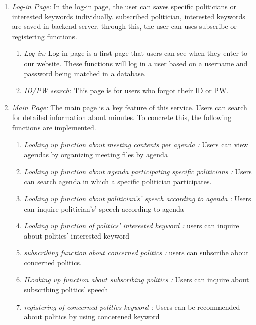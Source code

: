 \documentclass[conference]{IEEEtran}
\begin{document}
\begin{enumerate}
	\item \textit {Log-in Page:} 
In the log-in page, the user can saves specific politicians or interested keywords individually. subscribed politician, interested keywords are saved in backend server. through this, the user can uses subscribe or registering functions.\\
    \begin{enumerate}
    	\item \textit {Log-in:} Log-in page is a first page that users can see when they enter to our website. These functions will log in a user based on a username and password being matched in a database.\\
        \item \textit {ID/PW search:} This page is for users who forgot their ID or PW.\\
    \end{enumerate}
    
    \item \textit {Main Page:}  The main page is a key feature of this service. Users can search for detailed information about minutes. To concrete this, the following functions are implemented. \\
    \begin{enumerate}
    	\item \textit {Looking up function about meeting contents per agenda :} Users can view agendas by organizing meeting files by agenda\\
        \item \textit {Looking up function about agenda participating specific politicians :} Users can search agenda in which a specific politician participates.\\
        \item \textit {Looking up  function about politician’s' speech according to agenda :} Users can inquire politician’s' speech according to agenda\\
        \item \textit {Looking up function of politics’ interested keyword :} users can inquire about politics’ interested keyword\\
        \item \textit {subscribing function about concerned politics :} users can subscribe about concerned politics.\
        \item \textit {ILooking up  function about subscribing politics :} Users can inquire about subscribing politics’ speech\\
        \item \textit {registering of concerned politics keyword :} Users can be recommended about politics by using concerened keyword\\


    \end{enumerate}

\end{enumerate}
\end{document}
